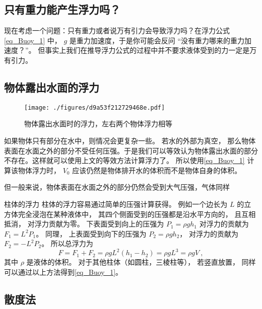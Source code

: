 \subsection{只有重力能产生浮力吗？}
现在考虑一个问题：只有重力或者说万有引力会导致浮力吗？在浮力公式\autoref{eq_Buoy_1} 中， $g$ 是重力加速度，于是你可能会反问 “没有重力哪来的重力加速度？”。 但事实上我们在推导浮力公式的过程中并不要求液体受到的力一定是万有引力。

\subsection{物体露出水面的浮力}
\begin{figure}[ht]
\centering
\texttt{[image: ./figures/d9a53f212729468e.pdf]}
\caption{物体露出水面时的浮力，左右两个物体浮力相等} \label{fig_Buoy_2}
\end{figure}
如果物体只有部分在水中，则情况会更复杂一些。 若水的外部为真空， 那么物体表面在水面之外的部分不受任何压强。于是我们可以等效认为物体露出水面的部分不存在。这样就可以使用上文的等效方法计算浮力了。 所以使用\autoref{eq_Buoy_1} 计算该物体浮力时， $V_0$ 应该仍然是物体排开水的体积而不是物体自身的体积。


但一般来说，物体表面在水面之外的部分仍然会受到大气压强，气体同样

\begin{example}{柱体的浮力}
柱体的浮力容易通过简单的压强计算获得。 例如一个边长为 $L$ 的立方体完全浸泡在某种液体中， 其四个侧面受到的压强都是沿水平方向的， 且互相抵消， 对浮力贡献为零。 下表面受到向上的压强为 $P_1 = \rho g h_1$ 对浮力的贡献为 $F_1 = L^2 P_1$。 同理， 上表面受到向下的压强为 $P_2 = \rho g h_2$， 对浮力的贡献为 $F_2 = -L^2 P_2$。 所以总浮力为
\begin{equation}
F = F_1 + F_2 = \rho g L^2 (h_1 - h_2) = \rho g L^3 = \rho g V~,
\end{equation}
其中 $\rho$ 是液体的体积。 对于其他柱体（如圆柱，三棱柱等）， 若竖直放置， 同样可以通过以上方法得到\autoref{eq_Buoy_1}。
\end{example}

\subsection{散度法}

